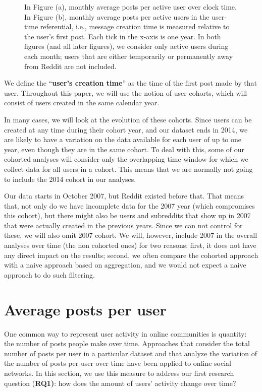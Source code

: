 \documentclass[10pt, oneside, onecolumn]{article}
\begin{document}
\begin{figure}[!tb]
\centering
{}
\caption{In Figure (a), monthly average posts per active user over clock time. In Figure (b), monthly average posts per active users in the user-time referential, i.e., message creation time is measured relative to the user's first post.  Each tick in the x-axis is one year.  In both figures (and all later figures), we consider only active users during each month; users that are either temporarily or permanently away from Reddit are not included.}
\label{fig:overall_posts}
\end{figure}

We define the ``\textbf{user's creation time}'' as the time of the first post made by that user.  Throughout this paper, we will use the notion of user cohorts, which will consist of users created in the same calendar year.

In many cases, we will look at the evolution of these cohorts. Since users can be created at any time during their cohort year, and our dataset ends in 2014, 
we are likely to have a variation on the data available for each user of up to one year, even though they are in the same cohort.  To deal with this, some of our cohorted analyses will consider only the overlapping time window for which we collect data for all users in a cohort.   This means that we are normally not going to include the 2014 cohort in our analyses.

Our data starts in October 2007, but Reddit existed before that. That means that, not only do we have incomplete data for the 2007 year (which compromises this cohort), but there might also be users and subreddits that show up in 2007 that were actually created in the previous years. Since we can not control for these, we will also omit 2007 cohort. We will, however, include 2007 in the overall analyses over time (the non cohorted ones) for two reasons: first, it does not have any direct impact on the results; second, we often compare the cohorted approach with a naive approach based on aggregation, and we would not expect a naive approach to do such filtering. 


\section{Average posts per user}
One common way to represent user activity in online communities is quantity: the number of posts people make over time. Approaches that consider the total number of posts per user in a particular dataset \cite{Gruhl2004} and that analyze the variation of the number of posts per user over time \cite{Guo2009} have been applied to online social networks.  In this section, we use this measure to address our first research question (\textbf{RQ1)}: how does the amount of users' activity change over time?
\end{document}

